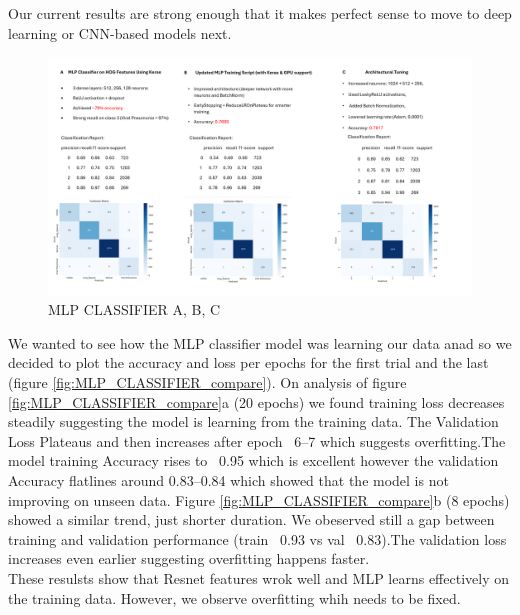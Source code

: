 \documentclass{article}
\begin{document}
Our current results are strong enough that it makes perfect sense to move to deep learning or CNN-based models next.
\begin{figure}[ht] %
    \centering
    \includegraphics[width=1.0\linewidth]{mlpclassifier a,b,c.png}
    \caption{MLP CLASSIFIER A, B, C}
    \label{fig:MLP_CLASSIFIER}
\end{figure}

We wanted to see how the MLP classifier model was learning our data anad so we decided to plot the accuracy and loss per epochs for the first trial and the last (figure \ref{fig:MLP_CLASSIFIER_compare}). On analysis of figure \ref{fig:MLP_CLASSIFIER_compare}a (20 epochs) we found training loss decreases steadily suggesting the model is learning from the training data.
The Validation Loss Plateaus and then increases after epoch ~6–7 which suggests overfitting.The model training Accuracy rises to ~0.95 which is excellent however the validation Accuracy flatlines around 0.83–0.84 which showed that the model is not improving on unseen data.
Figure \ref{fig:MLP_CLASSIFIER_compare}b (8 epochs) showed a similar trend, just shorter duration. We obeserved still a gap between training and validation performance (train ~0.93 vs val ~0.83).The validation loss increases even earlier suggesting overfitting happens faster.\\
These resulsts show that Resnet features wrok well and MLP learns effectively on the training data. However, we observe overfitting whih needs to be fixed.\\
\end{document}
